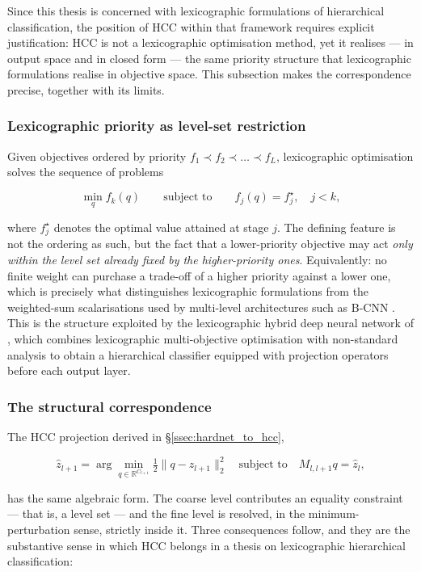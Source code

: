 Since this thesis is concerned with lexicographic formulations of hierarchical classification, the position of HCC within that framework requires explicit justification: HCC is not a lexicographic optimisation method, yet it realises --- in output space and in closed form --- the same priority structure that lexicographic formulations realise in objective space. This subsection makes the correspondence precise, together with its limits.

\subsubsection{Lexicographic priority as level-set restriction}

Given objectives ordered by priority $f_1\prec f_2\prec\dots\prec f_L$, lexicographic optimisation solves the sequence of problems

\[
\min_{q} f_k(q)
\qquad\text{subject to}\qquad
f_j(q)=f_j^{\star},\quad j<k,
\]

where $f_j^\star$ denotes the optimal value attained at stage $j$. The defining feature is not the ordering as such, but the fact that a lower-priority objective may act \emph{only within the level set already fixed by the higher-priority ones}. Equivalently: no finite weight can purchase a trade-off of a higher priority against a lower one, which is precisely what distinguishes lexicographic formulations from the weighted-sum scalarisations used by multi-level architectures such as B-CNN \cite{zhu2017bcnn}. This is the structure exploited by the lexicographic hybrid deep neural network of \cite{fiaschi2024informed}, which combines lexicographic multi-objective optimisation with non-standard analysis \cite{benci2022nonstandard,benci2019measure} to obtain a hierarchical classifier equipped with projection operators before each output layer.

\subsubsection{The structural correspondence}

The HCC projection derived in \S\ref{ssec:hardnet_to_hcc},

\[
\hat z_{l+1}
=
\arg\min_{q\in\mathbb{R}^{C_{l+1}}}
\tfrac{1}{2}\lVert q-z_{l+1}\rVert_2^2
\quad\text{subject to}\quad
M_{l,l+1}q=\hat z_l,
\]

has the same algebraic form. The coarse level contributes an equality constraint --- that is, a level set --- and the fine level is resolved, in the minimum-perturbation sense, strictly inside it. Three consequences follow, and they are the substantive sense in which HCC belongs in a thesis on lexicographic hierarchical classification:

